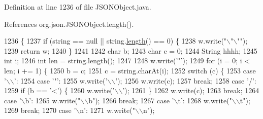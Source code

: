 Definition at line 1236 of file J\-S\-O\-N\-Object.\-java.



References org.\-json.\-J\-S\-O\-N\-Object.\-length().


\begin{DoxyCode}
1236                                                                            \{
1237         \textcolor{keywordflow}{if} (\textcolor{keywordtype}{string} == null || \textcolor{keywordtype}{string}.\hyperlink{classorg_1_1json_1_1_j_s_o_n_object_a2c47910737728e063a8395d3a9152d42}{length}() == 0) \{
1238             w.write(\textcolor{stringliteral}{"\(\backslash\)"\(\backslash\)""});
1239             \textcolor{keywordflow}{return} w;
1240         \}
1241 
1242         \textcolor{keywordtype}{char} b;
1243         \textcolor{keywordtype}{char} c = 0;
1244         String hhhh;
1245         \textcolor{keywordtype}{int} i;
1246         \textcolor{keywordtype}{int} len = \textcolor{keywordtype}{string}.length();
1247 
1248         w.write(\textcolor{charliteral}{'"'});
1249         \textcolor{keywordflow}{for} (i = 0; i < len; i += 1) \{
1250             b = c;
1251             c = \textcolor{keywordtype}{string}.charAt(i);
1252             \textcolor{keywordflow}{switch} (c) \{
1253             \textcolor{keywordflow}{case} \textcolor{charliteral}{'\(\backslash\)\(\backslash\)'}:
1254             \textcolor{keywordflow}{case} \textcolor{charliteral}{'"'}:
1255                 w.write(\textcolor{charliteral}{'\(\backslash\)\(\backslash\)'});
1256                 w.write(c);
1257                 \textcolor{keywordflow}{break};
1258             \textcolor{keywordflow}{case} \textcolor{charliteral}{'/'}:
1259                 \textcolor{keywordflow}{if} (b == \textcolor{charliteral}{'<'}) \{
1260                     w.write(\textcolor{charliteral}{'\(\backslash\)\(\backslash\)'});
1261                 \}
1262                 w.write(c);
1263                 \textcolor{keywordflow}{break};
1264             \textcolor{keywordflow}{case} \textcolor{charliteral}{'\(\backslash\)b'}:
1265                 w.write(\textcolor{stringliteral}{"\(\backslash\)\(\backslash\)b"});
1266                 \textcolor{keywordflow}{break};
1267             \textcolor{keywordflow}{case} \textcolor{charliteral}{'\(\backslash\)t'}:
1268                 w.write(\textcolor{stringliteral}{"\(\backslash\)\(\backslash\)t"});
1269                 \textcolor{keywordflow}{break};
1270             \textcolor{keywordflow}{case} \textcolor{charliteral}{'\(\backslash\)n'}:
1271                 w.write(\textcolor{stringliteral}{"\(\backslash\)\(\backslash\)n"});

\end{DoxyCode}
